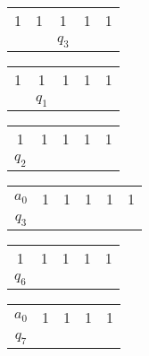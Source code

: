 \documentclass[14pt, a4paper]{article}
\begin{document}
    \begin{center}
        \begin{tabular}{ | c c c c c | }
            \hline
            1 & 1 & 1 & 1 & 1 \\
            & & $q_3$ & & \\
            \hline
        \end{tabular}
    \end{center}
    
    \begin{center}
        \begin{tabular}{ | c c c c c | }
            \hline
            1 & 1 & 1 & 1 & 1 \\
            & $q_1$ & & & \\
            \hline
        \end{tabular}
    \end{center}
    
    \begin{center}
        \begin{tabular}{ | c c c c c | }
            \hline
            1 & 1 & 1 & 1 & 1 \\
            $q_2$ & & & & \\
            \hline
        \end{tabular}
    \end{center}
    
    \begin{center}
        \begin{tabular}{ | c c c c c c | }
            \hline
            $a_0$ & 1 & 1 & 1 & 1 & 1 \\
            $q_3$ & & & & & \\
            \hline
        \end{tabular}
    \end{center}
    
    \begin{center}
        \begin{tabular}{ | c c c c c | }
            \hline
            1 & 1 & 1 & 1 & 1 \\
            $q_6$ & & & & \\
            \hline
        \end{tabular}
    \end{center}
    
    \begin{center}
        \begin{tabular}{ | c c c c c | }
            \hline
            $a_0$ & 1 & 1 & 1 & 1 \\
            $q_7$ & & & & \\
            \hline
        \end{tabular}
    \end{center}
    
\end{document}
